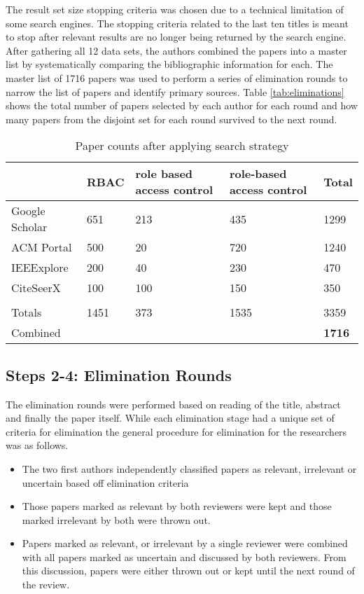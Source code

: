 The result set size stopping criteria was chosen due to a technical limitation of some search engines.  The stopping criteria related to the last ten titles is meant to stop after relevant results are no longer being returned by the search engine.  After gathering all 12 data sets, the authors combined the papers into a master list by systematically comparing the bibliographic information for each.  The master list of 1716 papers was used to perform a series of elimination rounds to narrow the list of papers and identify primary sources.  Table \ref{tab:eliminations} shows the total number of papers selected by each author for each round and how many papers from the disjoint set for each round survived to the next round.

\begin{table}
\centering
\begin{tabular}{|p{3.5cm}|p{1.25cm}|p{4.25cm}|p{4.25cm}|p{1cm}|}

\hline
 & 
\textbf{RBAC} & 
\textbf{role based access control} & 
\textbf{role-based access control} & 
\textbf{Total}
\\\hline

Google Scholar & 651 & 213 & 435 & 1299 \\\hline
ACM Portal & 500 & 20 & 720 & 1240 \\\hline
IEEExplore & 200 & 40 & 230 & 470 \\\hline
CiteSeerX & 100 & 100 & 150 & 350 \\\hline
 &  &  &  & \\\hline
Totals & 1451 & 373 & 1535 & 3359 \\\hline
Combined &  &  &  & \textbf{1716} \\\hline

\end{tabular}
\caption{Paper counts after applying search strategy}
\label{tab:search_results}
\end{table}

\subsection{Steps 2-4: Elimination Rounds}

The elimination rounds were performed based on reading of the title, abstract and finally the paper itself.  While each elimination stage had a unique set of criteria for elimination the general procedure for elimination for the researchers was as follows.

\begin{itemize}
\setlength{\itemsep}{0.25pt}
\item The two first authors independently classified papers as relevant, irrelevant or uncertain based off elimination criteria
\item Those papers marked as relevant by both reviewers were kept and those marked irrelevant by both were thrown out.
\item Papers marked as relevant, or irrelevant by a single reviewer were combined with all papers marked as uncertain and discussed by both reviewers.  From this discussion, papers were either thrown out or kept until the next round of the review.
\end{itemize}

